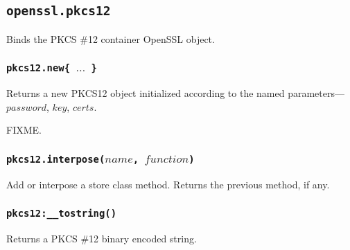 \documentclass[11pt, oneside]{memoir}
\newcommand*{\fn}[1]{\texttt{#1}\xspace}
\newcounter{toccols}
\newenvironment{Module}[1]{
	\subsection{\texttt{#1}}
	\addtocontents{toc}{
		\protect\begin{multicols}{\value{toccols}}
	}
}{
	\addtocontents{toc}{\protect\end{multicols}}
}
\begin{document}
\begin{Module}{openssl.pkcs12}

Binds the PKCS \#12 container OpenSSL object.

\subsubsection[\fn{pkcs12.new}]{\fn{pkcs12.new\{ $\ldots$ \}}}

Returns a new PKCS12 object initialized according to the named parameters---$password$, $key$, $certs$.

FIXME.

\subsubsection[\fn{pkcs12.interpose}]{\fn{pkcs12.interpose($name$, $function$)}}

Add or interpose a store class method. Returns the previous method, if any.

\subsubsection[\fn{pkcs12:\_\_tostring}]{\fn{pkcs12:\_\_tostring()}}

Returns a PKCS \#12 binary encoded string.

\end{Module}
\end{document}
